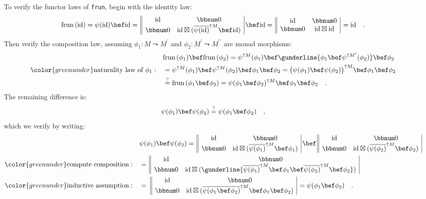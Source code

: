 To verify the functor laws of \lstinline!frun!, begin with the identity
law:
\[
\text{frun}\,(\text{id})=\psi(\text{id})\bef\text{id}=\,\begin{array}{||cc|}
\text{id} & \bbnum 0\\
\bbnum 0 & \text{id}\boxtimes(\overline{\psi(\text{id)}}^{\uparrow M}\bef\text{id})
\end{array}\,\bef\text{id}=\,\begin{array}{||cc|}
\text{id} & \bbnum 0\\
\bbnum 0 & \text{id}\boxtimes\text{id}
\end{array}\,=\text{id}\quad.
\]
Then verify the composition law, assuming $\phi_{1}:M\leadsto M^{\prime}$
and $\phi_{2}:M^{\prime}\leadsto M^{\prime\prime}$ are monad morphisms:
\begin{align*}
 & \text{frun}\,(\phi_{1})\bef\text{frun}\,(\phi_{2})=\psi^{\uparrow M}(\phi_{1})\bef\gunderline{\phi_{1}\bef\psi^{\uparrow M^{\prime}}(\phi_{2})}\bef\phi_{2}\\
{\color{greenunder}\text{naturality law of }\phi_{1}:}\quad & =\psi^{\uparrow M}(\phi_{1})\bef\psi^{\uparrow M}(\phi_{2})\bef\phi_{1}\bef\phi_{2}=\big(\psi(\phi_{1})\bef\psi(\phi_{2})\big)^{\uparrow M}\bef\phi_{1}\bef\phi_{2}\\
 & \overset{?}{=}\text{frun}\,(\phi_{1}\bef\phi_{2})=\psi(\phi_{1}\bef\phi_{2})^{\uparrow M}\bef\phi_{1}\bef\phi_{2}\quad.
\end{align*}
The remaining difference is:
\[
\psi(\phi_{1})\bef\psi(\phi_{2})\overset{?}{=}\psi(\phi_{1}\bef\phi_{2})\quad,
\]
which we verify by writing:
\begin{align*}
 & \psi(\phi_{1})\bef\psi(\phi_{2})=\,\begin{array}{||cc|}
\text{id} & \bbnum 0\\
\bbnum 0 & \text{id}\boxtimes(\overline{\psi(\phi_{1}\text{)}}^{\uparrow M}\bef\phi_{1})
\end{array}\,\bef\,\begin{array}{||cc|}
\text{id} & \bbnum 0\\
\bbnum 0 & \text{id}\boxtimes(\overline{\psi(\phi_{2}\text{)}}^{\uparrow M}\bef\phi_{2})
\end{array}\\
{\color{greenunder}\text{compute composition}:}\quad & =\,\begin{array}{||cc|}
\text{id} & \bbnum 0\\
\bbnum 0 & \text{id}\boxtimes(\gunderline{\overline{\psi(\phi_{1}\text{)}}^{\uparrow M}\bef\phi_{1}\bef\overline{\psi(\phi_{2}\text{)}}^{\uparrow M}\bef\phi_{2}})
\end{array}\\
{\color{greenunder}\text{inductive assumption}:}\quad & =\,\,\begin{array}{||cc|}
\text{id} & \bbnum 0\\
\bbnum 0 & \text{id}\boxtimes(\overline{\psi(\phi_{1}\bef\phi_{2}\text{)}}^{\uparrow M}\bef\phi_{1}\bef\phi_{2})
\end{array}\,=\psi(\phi_{1}\bef\phi_{2})\quad.
\end{align*}


